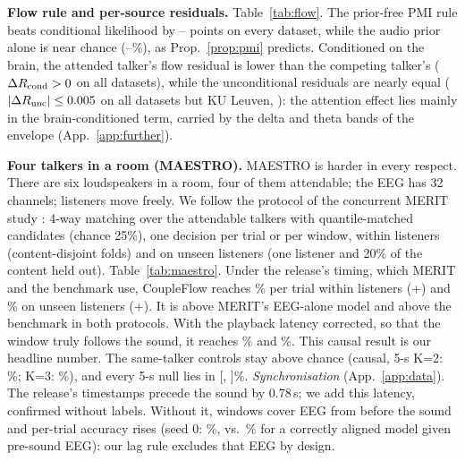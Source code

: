 \documentclass[10pt,twocolumn,letterpaper]{article}
\begin{document}
\textbf{Flow rule and per-source residuals.} Table~\ref{tab:flow}. The prior-free PMI rule
beats conditional likelihood by \pmiGapMin--\pmiGapMax{} points on every dataset, while the audio prior alone
is near chance (\pmiPriorMin--\pmiPriorMax\%), as Prop.~\ref{prop:pmi} predicts. Conditioned on the brain, the attended
talker's flow residual is lower than the competing talker's
($\Delta R_{\rm cond}>0$ on all datasets), while the unconditional residuals are nearly equal
($|\Delta R_{\rm unc}|\le0.005$ on all datasets but KU Leuven, \dRuncKUL): the attention effect
lies mainly in the brain-conditioned term, carried by the delta and theta bands of the
envelope (App.~\ref{app:further}).

\begin{table}[!t]\centering\small
\caption{Flow-head decision rules at 5\,s (\%): prior-free PMI, conditional likelihood
only, audio prior only, and the PMI rule's EEG-shuffle null.
$\Delta R=R(\text{comp.})-R(\text{att.})$ for the conditional ($R_{\rm cond}$) and
unconditional ($R_{\rm unc}$) residuals; for SparrKULee and MEG-MASC the negative is the
mismatched window. Seed 0. NH/HI: normal-hearing/hearing-impaired listeners;
zh: Mandarin.}\label{tab:flow}
\resizebox{\columnwidth}{!}{}
\end{table}

\textbf{Four talkers in a room (MAESTRO).} MAESTRO \citep{maestro2026} is harder in
every respect. There are six loudspeakers in a room, four of them attendable; the EEG has
32 channels; listeners move freely. We follow the protocol of the concurrent MERIT
study \citep{merit2026}: 4-way
matching over the attendable talkers with quantile-matched candidates (chance 25\%), one
decision per trial or per window, within listeners (content-disjoint folds) and on unseen
listeners (one listener and 20\% of the content held out). Table~\ref{tab:maestro}. Under
the release's timing, which MERIT and the benchmark use, CoupleFlow reaches \maePWTrial\% per
trial within listeners (+\maePWCon) and \maePLTrial\% on unseen listeners (+\maePLCon). It is
above MERIT's EEG-alone model and above the benchmark in both protocols. With the playback
latency corrected, so that the window truly follows the sound, it reaches \maeWTrial\% and
\maeLTrial\%. This causal result is our headline number. The same-talker controls stay above chance (causal, 5-s K=2:
\maeWStTwo\%; K=3: \maeWStThree\%), and every 5-s null lies in [\maMainNullMin, \maMainNullMax]\%.
\emph{Synchronisation} (App.~\ref{app:data}). The release's timestamps precede the sound
by 0.78\,s; we add this latency, confirmed without labels. Without it, windows cover EEG
from before the sound and per-trial accuracy rises (seed 0: \maePkgTrial\%, vs.\ \maePreTrial\%
for a correctly aligned model given pre-sound EEG): our lag rule excludes that EEG by design.
\end{document}

